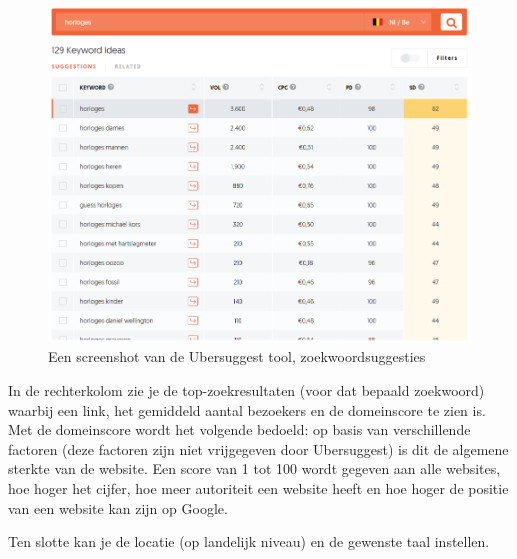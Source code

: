 \begin{figure}[h!]
\centering
\includegraphics[width=\linewidth]{img/ubers.PNG}
\caption{Een screenshot van de Ubersuggest tool, zoekwoordsuggesties \autocite{ubersuggest}}
\end{figure}

In de rechterkolom zie je de top-zoekresultaten (voor dat bepaald zoekwoord) waarbij een link, het gemiddeld aantal bezoekers en de domeinscore te zien is. Met de domeinscore wordt het volgende bedoeld: op basis van verschillende factoren (deze factoren zijn niet vrijgegeven door Ubersuggest) is dit de algemene sterkte van de website. Een score van 1 tot 100 wordt gegeven aan alle websites, hoe hoger het cijfer, hoe meer autoriteit een website heeft en hoe hoger de positie van een website kan zijn op Google. 

Ten slotte kan je de locatie (op landelijk niveau) en de gewenste taal instellen. 

